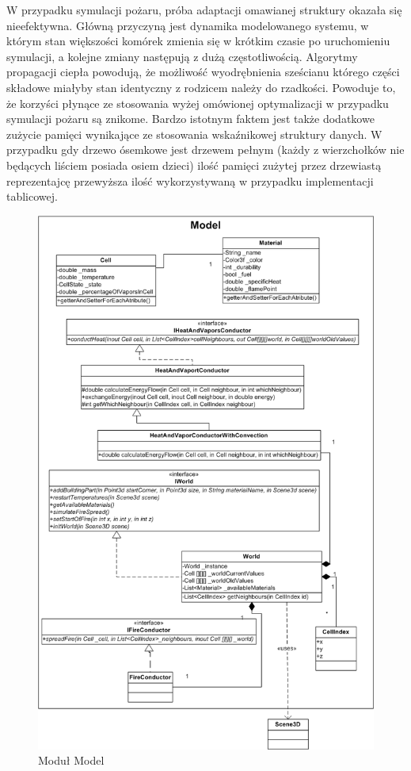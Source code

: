 W przypadku symulacji pożaru, próba adaptacji omawianej struktury okazała się nieefektywna.
Główną przyczyną jest dynamika modelowanego systemu, w którym stan większości komórek zmienia się w krótkim czasie po uruchomieniu symulacji, a kolejne zmiany następują z dużą częstotliwością. Algorytmy propagacji ciepła powodują, że możliwość wyodrębnienia  sześcianu  którego części składowe miałyby stan identyczny z rodzicem należy do rzadkości. Powoduje to, że korzyści płynące ze stosowania wyżej omówionej optymalizacji w przypadku symulacji pożaru są znikome. 
 Bardzo istotnym faktem jest także dodatkowe zużycie pamięci wynikające ze stosowania wskaźnikowej struktury danych. W przypadku gdy drzewo ósemkowe jest drzewem pełnym (każdy z wierzchołków nie będących liściem posiada osiem dzieci) ilość pamięci zużytej przez drzewiastą reprezentajcę przewyższa ilość wykorzystywaną w przypadku implementacji tablicowej.
\begin{figure}
\begin {center}
\includegraphics{uml_model.png} 
\caption {Moduł Model}
\label {uml_model}
\end {center}
\end{figure}

